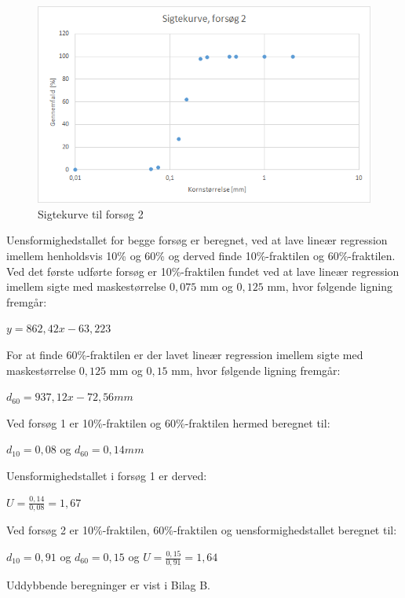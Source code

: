 \begin{figure}[htbp]
		\centering
		\includegraphics[width=1.0\textwidth]{billeder/sigtekurve2.png}
		\caption{Sigtekurve til forsøg 2}
		\label{fig:sigtekurve2}
\end{figure}

Uensformighedstallet for begge forsøg er beregnet, ved at lave lineær regression imellem henholdsvis 10\% og 60\% og derved finde 10\%-fraktilen og 60\%-fraktilen.
\newline
\newline
Ved det første udførte forsøg er 10\%-fraktilen fundet ved at lave lineær regression imellem sigte med maskestørrelse $0,\!075$ mm og $0,\!125$ mm, hvor følgende ligning fremgår: 

\begin{center}
	$y = 862,\!42x - 63,\!223$
\end{center}

For at finde 60\%-fraktilen er der lavet lineær regression imellem sigte med maskestørrelse $0,\!125$ mm og $0,\!15$ mm, hvor følgende ligning fremgår:

\begin{center}
	$d_{60}=937,\!12x - 72,\!56mm$
\end{center}

Ved forsøg 1 er 10\%-fraktilen og 60\%-fraktilen hermed beregnet til: 
\begin{center}
	$d_{10} = 0,\!08$ og $d_{60} = 0,\!14mm$
\end{center} 

Uensformighedstallet i forsøg 1 er derved:
\begin{center}
	$U = \frac{0,\!14}{0,\!08} = 1,\!67$
\end{center}

Ved forsøg 2 er 10\%-fraktilen, 60\%-fraktilen og uensformighedstallet beregnet til:
\begin{center}
	$d_{10} = 0,\!91$ og $d_{60} = 0,\!15$ og $U = \frac{0,\!15}{0,\!91} = 1,\!64$
\end{center} 
Uddybbende beregninger er vist i Bilag B.

